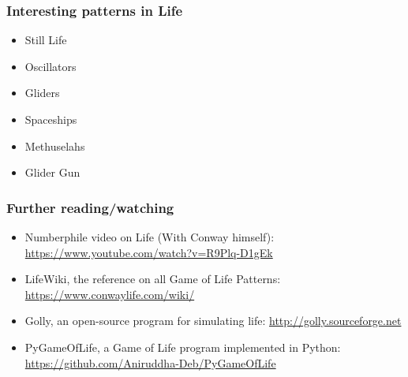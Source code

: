 \documentclass[handout]{beamer}
\begin{document}
\begin{frame}
\frametitle{Interesting patterns in Life}
\begin{itemize}
\pause
\item{Still Life}
\pause
\item{Oscillators}
\pause
\item{Gliders}
\pause
\item{Spaceships}
\pause
\item{Methuselahs}
\pause
\item{Glider Gun}
\end{itemize}
\end{frame}

\begin{frame}
\frametitle{Further reading/watching}
\begin{itemize}
\item{Numberphile video on Life (With Conway himself): \url{https://www.youtube.com/watch?v=R9Plq-D1gEk}}
\item{LifeWiki, the reference on all Game of Life Patterns: \url{https://www.conwaylife.com/wiki/}}
\item{Golly, an open-source program for simulating life: \url{http://golly.sourceforge.net}}
\item{PyGameOfLife, a Game of Life program implemented in Python: \url{https://github.com/Aniruddha-Deb/PyGameOfLife}}
\end{itemize}
\end{frame}
\end{document}

